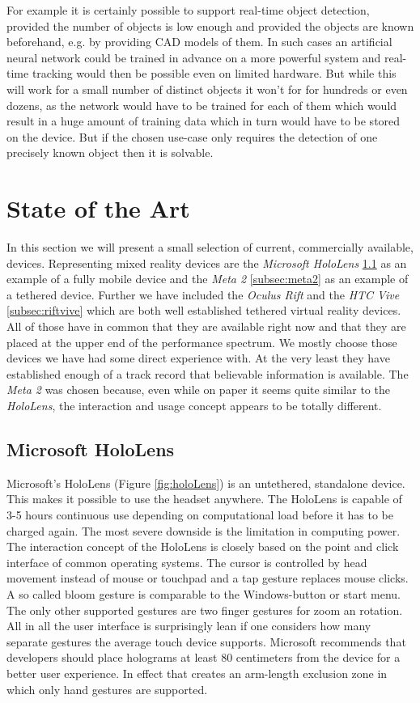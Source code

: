 \documentclass[11pt, a4paper]{IEEEtran}
\begin{document}
For example it is certainly possible to support real-time object detection, provided the number of objects is low enough and provided the objects are known beforehand, e.g. by providing CAD models of them. In such cases an artificial neural network could be trained in advance on a more powerful system and real-time tracking would then be possible even on limited hardware. But while this will work for a small number of distinct objects it won't for for hundreds or even dozens, as the network would have to be trained for each of them which would result in a huge amount of training data which in turn would have to be stored on the device. But if the chosen use-case only requires the detection of one precisely known object then it is solvable.


\section{State of the Art}\label{sec:stateoftheart}
In this section we will present a small selection of current, commercially available, devices. Representing mixed reality devices are the \textit{Microsoft HoloLens} \ref{subsec:holoLens} as an example of a fully mobile device and the \textit{Meta 2} \ref{subsec:meta2} as an example of a tethered device.  
Further we have included the \textit{Oculus Rift} and the \textit{HTC Vive} \ref{subsec:riftvive} which are both well established tethered virtual reality devices. All of those have in common that they are available right now and that they are placed at the upper end of the performance spectrum. We mostly choose those devices we have had some direct experience with. At the very least they have established enough of a track record that believable information is available. The \textit{Meta 2} was chosen because, even while on paper it seems quite similar to the \textit{HoloLens}, the interaction and usage concept appears to be totally different.


\subsection{Microsoft HoloLens}\label{subsec:holoLens}
Microsoft's HoloLens (Figure \ref{fig:holoLens}) is an untethered, standalone device. This makes it possible to use the headset anywhere. The HoloLens is capable of 3-5 hours continuous use depending on computational load before it has to be charged again. The most severe downside is the limitation in computing power. The interaction concept of the HoloLens is closely based on the point and click interface of common operating systems. The cursor is controlled by head movement instead of mouse or touchpad and a tap gesture replaces mouse clicks. A so called bloom gesture is comparable to the Windows-button or start menu. The only other supported gestures are two finger gestures for zoom an rotation. All in all the user interface is surprisingly lean if one considers how many separate gestures the average touch device supports. Microsoft recommends that developers should place holograms at least 80 centimeters from the device for a better user experience. In effect that creates an arm-length exclusion zone in which only hand gestures are supported.
\end{document}
